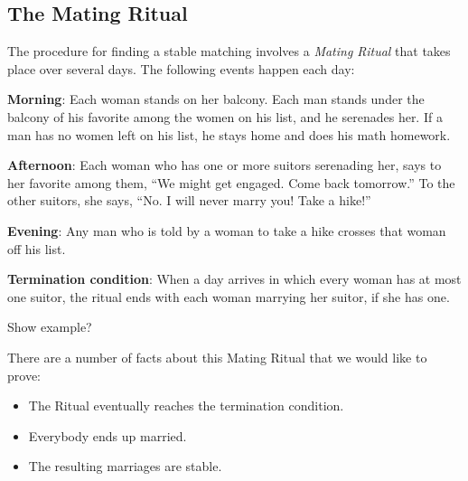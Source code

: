 \subsection{The Mating Ritual}

The procedure for finding a stable matching involves a \emph{Mating
Ritual} that takes place over several days.  The following events happen
each day:

\textbf{Morning}: Each woman stands on her balcony.  Each man stands
under the balcony of his favorite among the women on his list, and he
serenades her.  If a man has no women left on his list, he stays home
and does his math homework.

\textbf{Afternoon}: Each woman who has one or more suitors serenading
her, says to her favorite among them, ``We might get engaged.  Come
back tomorrow.''  To the other suitors, she says, ``No.  I will never
marry you!  Take a hike!''

\textbf{Evening}: Any man who is told by a woman to take a hike
crosses that woman off his list.

\textbf{Termination condition}: When a day arrives in which every
woman has at most one suitor, the ritual ends with each woman marrying
her suitor, if she has one.

\begin{editingnotes}
Show example?
\end{editingnotes}

There are a number of facts about this Mating Ritual that we would like to
prove:

\begin{itemize}
\item The Ritual eventually reaches the termination condition.
\item Everybody ends up married.
\item The resulting marriages are stable.
\end{itemize}


